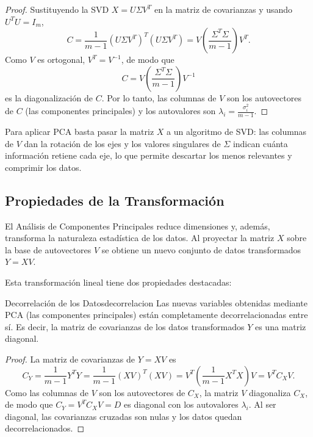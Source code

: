 \documentclass[11pt, a4paper]{article}
\begin{document}
\begin{proof}
Sustituyendo la SVD $X = U \Sigma V^T$ en la matriz de covarianzas y usando $U^T U = I_m$,
\[ C = \frac{1}{m-1} (U \Sigma V^T)^T (U \Sigma V^T) = V \left( \frac{\Sigma^T \Sigma}{m-1} \right) V^T. \]
Como $V$ es ortogonal, $V^T = V^{-1}$, de modo que
\[ C = V \left( \frac{\Sigma^T \Sigma}{m-1} \right) V^{-1} \]
es la diagonalización de $C$. Por lo tanto, las columnas de $V$ son los autovectores de $C$ (las componentes principales) y los autovalores son $\lambda_i = \frac{\sigma_i^2}{m-1}$.
\end{proof}

\obs Para aplicar PCA basta pasar la matriz $X$ a un algoritmo de SVD: las columnas de $V$ dan la rotación de los ejes y los valores singulares de $\Sigma$ indican cuánta información retiene cada eje, lo que permite descartar los menos relevantes y comprimir los datos.

\subsection{Propiedades de la Transformación}

El Análisis de Componentes Principales reduce dimensiones y, además, transforma la naturaleza estadística de los datos. Al proyectar la matriz $X$ sobre la base de autovectores $V$ se obtiene un nuevo conjunto de datos transformados $Y = XV$.

Esta transformación lineal tiene dos propiedades destacadas:

\begin{proposicion}{Decorrelación de los Datos}{decorrelacion}
Las nuevas variables obtenidas mediante PCA (las componentes principales) están completamente decorrelacionadas entre sí. Es decir, la matriz de covarianzas de los datos transformados $Y$ es una matriz diagonal.
\end{proposicion}

\begin{proof}
La matriz de covarianzas de $Y = XV$ es
\[ C_Y = \frac{1}{m-1} Y^T Y = \frac{1}{m-1} (XV)^T (XV) = V^T \left( \frac{1}{m-1} X^T X \right) V = V^T C_X V. \]
Como las columnas de $V$ son los autovectores de $C_X$, la matriz $V$ diagonaliza $C_X$, de modo que $C_Y = V^T C_X V = D$ es diagonal con los autovalores $\lambda_i$. Al ser diagonal, las covarianzas cruzadas son nulas y los datos quedan decorrelacionados.
\end{proof}
\end{document}
